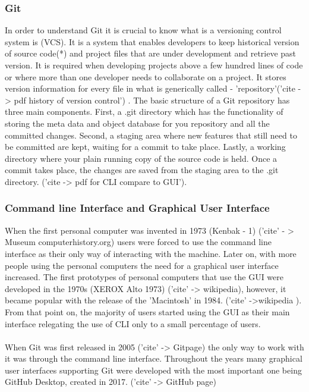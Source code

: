 \documentclass[]{report}
\begin{document}
	\subsubsection{Git}
	In order to understand Git it is crucial to know what is a versioning control system is (VCS). It is a system that enables developers to keep historical version of source code(*) and project files that are under development and retrieve past version. It is required when developing projects above a few hundred lines of code or where more than one developer needs to collaborate on a project. It stores version information for every file in what is generically called - 'repository'('cite -> pdf history of version control') . The basic structure of a Git repository has three main components. First, a .git directory which has the functionality of storing the meta data and object database for you repository and all the committed changes. Second, a staging area where new features that still need to be committed are kept, waiting for a commit to take place. Lastly, a working directory where your plain running copy of the source code is held. Once a commit takes place, the changes are saved from the staging area to the .git directory. ('cite -> pdf for CLI compare to GUI').
	
	\subsubsection{Command line Interface and Graphical User Interface}
	When the first personal computer was invented in 1973 (Kenbak - 1) ('cite' - > Museum computerhistory.org) users were forced to use the command line interface as their only way of interacting with the machine. Later on, with more people using the personal computers the need for a graphical user interface increased. The first prototypes of personal computers that use the GUI were developed in the 1970s (XEROX Alto 1973) ('cite' -> wikipedia), however, it became popular with the release of the 'Macintosh' in 1984. ('cite' ->wikipedia ). From that point on, the majority of users started using the GUI as their main interface relegating the use of CLI only to a small percentage of users.\\\\
	When Git was first released in 2005 ('cite' -> Gitpage) the only way to work with it was through the command line interface. Throughout the years many graphical user interfaces supporting Git were developed with the most important one being GitHub Desktop, created in 2017. ('cite' -> GitHub page)\\\\
	
\end{document}
